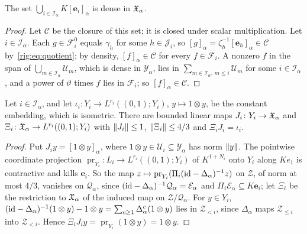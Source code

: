\begin{lemma}\label{rig:lem:dense}
The set $\bigcup_{i\in\mathcal I_\alpha}K[\mathbf e_i]_\alpha$ is dense in $\mathfrak X_\alpha$.
\end{lemma}

\begin{proof}
Let $\mathcal C$ be the closure of this set; it is closed under scalar multiplication. Let $i\in\mathcal I_\alpha$. Each
$g\in\mathcal F^0_i$ equals $\gamma_h$ for some $h\in\mathcal J_i$, so $[g]_\alpha=\zeta_h^{-1}[\mathbf e_h]_\alpha\in\mathcal C$
by~\eqref{rig:eq:quotient}; by density, $[f]_\alpha\in\mathcal C$ for every $f\in\mathcal F_i$. A nonzero $f$ in the span
of $\bigcup_{m\in\mathcal I_\alpha}\mathcal U_m$, which is dense in $\mathcal Y_\alpha$, lies in
$\sum_{m\in\mathcal I_\alpha,\,m\le i}\mathcal U_m$ for some $i\in\mathcal I_\alpha$, and a power of $\vartheta$ times $f$
lies in $\mathcal F_i$; so $[f]_\alpha\in\mathcal C$.
\end{proof}

\begin{lemma}\label{rig:lem:readouts}
Let $i\in\mathcal I_\alpha$, and let $\iota_i\colon Y_i\to L^{r_i}((0,1);Y_i)$, $y\mapsto1\otimes y$, be the constant
embedding, which is isometric. There are bounded linear maps $J_i\colon Y_i\to\mathfrak X_\alpha$ and
$\Xi_i\colon\mathfrak X_\alpha\to L^{r_i}((0,1);Y_i)$ with $\lVert J_i\rVert\le1$, $\lVert \Xi_i\rVert\le4/3$ and $\Xi_iJ_i=\iota_i$.
\end{lemma}

\begin{proof}
Put $J_iy=[1\otimes y]_\alpha$, where $1\otimes y\in\mathcal U_i\subseteq\mathcal Y_\alpha$ has norm $\lVert y\rVert$. The
pointwise coordinate projection $\operatorname{pr}_{Y_i}\colon L_i\to L^{r_i}((0,1);Y_i)$ of $K^{1+N_i}$ onto $Y_i$ along
$Ke_1$ is contractive and kills $\mathbf e_i$. So the map $z\mapsto\operatorname{pr}_{Y_i}(\Pi_i(\mathrm{id}-\Delta_\alpha)^{-1}z)$
on $\mathcal Z$, of norm at most $4/3$, vanishes on $\mathcal Q_\alpha$, since
$(\mathrm{id}-\Delta_\alpha)^{-1}\mathcal Q_\alpha=\mathcal E_\alpha$ and $\Pi_i\mathcal E_\alpha\subseteq K\mathbf e_i$; let
$\Xi_i$ be the restriction to $\mathfrak X_\alpha$ of the induced map on $\mathcal Z/\mathcal Q_\alpha$. For $y\in Y_i$,
$(\mathrm{id}-\Delta_\alpha)^{-1}(1\otimes y)-1\otimes y=\sum_{c\ge1}\Delta_\alpha^c(1\otimes y)$ lies in $\mathcal Z_{<i}$,
since $\Delta_\alpha$ maps $\mathcal Z_{\le i}$ into $\mathcal Z_{<i}$. Hence
$\Xi_iJ_iy=\operatorname{pr}_{Y_i}(1\otimes y)=1\otimes y$.
\end{proof}

